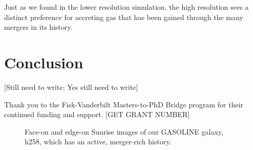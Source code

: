 \documentclass[manuscript]{aastex}
\begin{document}
Just as we found in the lower resolution simulation, the high resolution sees a distinct preference for accreting gas that has been gained through the many mergers in its history. 


\section{Conclusion}

[Still need to write; Yes still need to write]


\acknowledgments
Thank you to the Fisk-Vanderbilt Masters-to-PhD Bridge program for their continued funding and support. [GET GRANT NUMBER]


\begin{figure}
\centerline{}
\caption[]{Face-on and edge-on Sunrise images of our GASOLINE galaxy, h258, which has an active, merger-rich history.}
\label{h258face} 
\end{figure}
\end{document}

